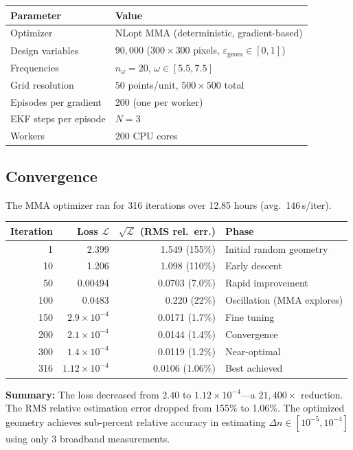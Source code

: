 \documentclass[11pt,a4paper]{article}
\begin{document}
\begin{center}
\begin{tabular}{@{}ll@{}}
\toprule
Parameter & Value \\
\midrule
Optimizer & NLopt MMA (deterministic, gradient-based) \\
Design variables & $90{,}000$ ($300 \times 300$ pixels, $\varepsilon_{\text{geom}} \in [0,1]$) \\
Frequencies & $n_\omega = 20$, $\omega \in [5.5, 7.5]$ \\
Grid resolution & $50$ points/unit, $500 \times 500$ total \\
Episodes per gradient & 200 (one per worker) \\
EKF steps per episode & $N = 3$ \\
Workers & 200 CPU cores \\
\bottomrule
\end{tabular}
\end{center}

\subsection{Convergence}

The MMA optimizer ran for 316 iterations over 12.85 hours (avg.\ 146\,s/iter).

\begin{center}
\begin{tabular}{@{}rrrl@{}}
\toprule
Iteration & Loss $\mathcal{L}$ & $\sqrt{\mathcal{L}}$ (RMS rel.\ err.) & Phase \\
\midrule
1  & 2.399  & 1.549 (155\%) & Initial random geometry \\
10 & 1.206  & 1.098 (110\%) & Early descent \\
50 & 0.00494 & 0.0703 (7.0\%) & Rapid improvement \\
100 & 0.0483 & 0.220 (22\%) & Oscillation (MMA explores) \\
150 & $2.9 \times 10^{-4}$ & 0.0171 (1.7\%) & Fine tuning \\
200 & $2.1 \times 10^{-4}$ & 0.0144 (1.4\%) & Convergence \\
300 & $1.4 \times 10^{-4}$ & 0.0119 (1.2\%) & Near-optimal \\
316 & $1.12 \times 10^{-4}$ & 0.0106 (1.06\%) & Best achieved \\
\bottomrule
\end{tabular}
\end{center}

\textbf{Summary:} The loss decreased from 2.40 to $1.12 \times 10^{-4}$---a $21{,}400\times$ reduction.  The RMS relative estimation error dropped from 155\% to 1.06\%.  The optimized geometry achieves sub-percent relative accuracy in estimating $\Delta n \in [10^{-5}, 10^{-4}]$ using only 3 broadband measurements.
\end{document}

